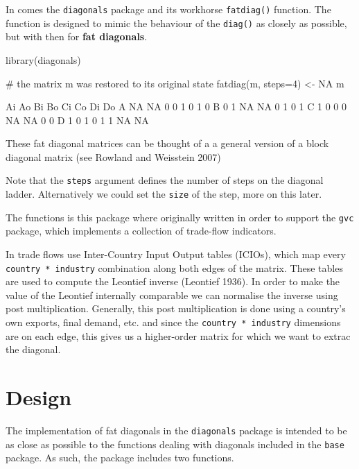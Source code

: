 \documentclass[article]{jss}
\begin{document}
In comes the \texttt{diagonals} package and its workhorse
\texttt{fatdiag()} function. The function is designed to mimic the
behaviour of the \texttt{diag()} as closely as possible, but with then
for \textbf{fat diagonals}.

\begin{CodeChunk}
\begin{CodeInput}
library(diagonals)
\end{CodeInput}
\end{CodeChunk}

\begin{CodeChunk}
\begin{CodeInput}
# the matrix m was restored to its original state
fatdiag(m, steps=4) <- NA
m
\end{CodeInput}
\begin{CodeOutput}
  Ai Ao Bi Bo Ci Co Di Do
A NA NA  0  0  1  0  1  0
B  0  1 NA NA  0  1  0  1
C  1  0  0  0 NA NA  0  0
D  1  0  1  0  1  1 NA NA
\end{CodeOutput}
\end{CodeChunk}

These fat diagonal matrices can be thought of a a general version of a
block diagonal matrix (see Rowland and Weisstein 2007)

Note that the \texttt{steps} argument defines the number of steps on the
diagonal ladder. Alternatively we could set the \texttt{size} of the
step, more on this later.

The functions is this package where originally written in order to
support the \texttt{gvc} package, which implements a collection of
trade-flow indicators.

In trade flows use Inter-Country Input Output tables (ICIOs), which map
every \texttt{country * industry} combination along both edges of the
matrix. These tables are used to compute the Leontief inverse (Leontief
1936). In order to make the value of the Leontief internally comparable
we can normalise the inverse using post multiplication. Generally, this
post multiplication is done using a country's own exports, final demand,
etc. and since the \texttt{country * industry} dimensions are on each
edge, this gives us a higher-order matrix for which we want to extrac
the diagonal.

\section{Design}\label{design}

The implementation of fat diagonals in the \texttt{diagonals} package is
intended to be as close as possible to the functions dealing with
diagonals included in the \texttt{base} package. As such, the package
includes two functions.
\end{document}
